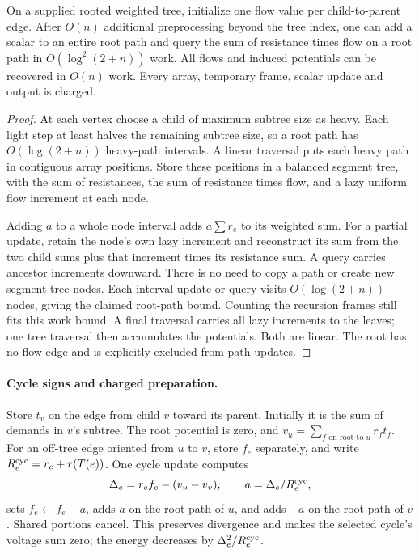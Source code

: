 \begin{proposition}
\label{prop:op3-heavy-path-flow}
On a supplied rooted weighted tree, initialize one flow value per
child-to-parent edge. After $O(n)$ additional preprocessing beyond the
tree index, one can add a scalar to an entire root path and query the
sum of resistance times flow on a root path in $O(\log^2(2+n))$ work.
All flows and induced potentials can be recovered in $O(n)$ work.
Every array, temporary frame, scalar update and output is charged.
\end{proposition}
\begin{proof}
At each vertex choose a child of maximum subtree size as heavy. Each
light step at least halves the remaining subtree size, so a root path
has $O(\log(2+n))$ heavy-path intervals. A linear traversal puts each
heavy path in contiguous array positions. Store these positions in a
balanced segment tree, with the sum of resistances, the sum of resistance
times flow, and a lazy uniform flow increment at each node.

Adding $a$ to a whole node interval adds $a\sum r_e$ to its weighted
sum. For a partial update, retain the node's own lazy increment and
reconstruct its sum from the two child sums plus that increment times
its resistance sum. A query carries ancestor increments downward.
There is no need to copy a path or create new segment-tree nodes.
Each interval update or query visits $O(\log(2+n))$ nodes, giving the
claimed root-path bound. Counting the recursion frames still fits this
work bound. A final traversal carries all lazy increments to the leaves;
one tree traversal then accumulates the potentials. Both are linear.
The root has no flow edge and is explicitly excluded from path updates.
\end{proof}

\paragraph{Cycle signs and charged preparation.}
Store $t_v$ on the edge from child $v$ toward its parent. Initially it
is the sum of demands in $v$'s subtree. The root potential is zero,
and $v_u=\sum_{f\text{ on root-to-}u}r_ft_f$.
For an off-tree edge oriented from $u$ to $v$, store $f_e$ separately,
and write $R_e^{\rm cyc}=r_e+r(T(e))$. One cycle update computes
\[
 \Delta_e=r_ef_e-(v_u-v_v),\qquad a=\Delta_e/R_e^{\rm cyc},
\]
sets $f_e\leftarrow f_e-a$, adds $a$ on the root path of $u$, and
adds $-a$ on the root path of $v$. Shared portions cancel. This preserves
divergence and makes the selected cycle's voltage sum zero; the energy
decreases by $\Delta_e^2/R_e^{\rm cyc}$.

